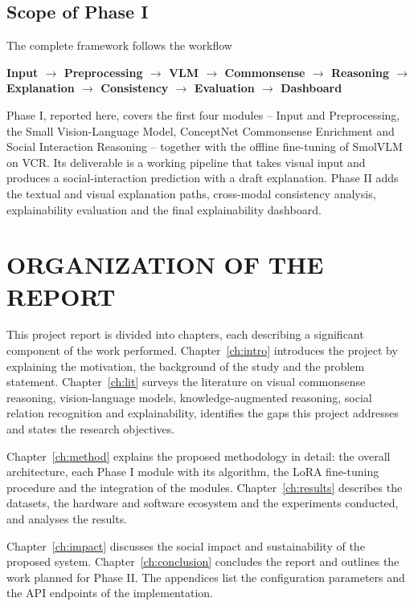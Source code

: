 \subsection{Scope of Phase I}
The complete framework follows the workflow
\begin{center}
\small\textbf{Input $\rightarrow$ Preprocessing $\rightarrow$ VLM $\rightarrow$ Commonsense $\rightarrow$ Reasoning $\rightarrow$ Explanation $\rightarrow$ Consistency $\rightarrow$ Evaluation $\rightarrow$ Dashboard}
\end{center}
Phase I, reported here, covers the first four modules -- Input and Preprocessing, the Small Vision-Language Model, ConceptNet Commonsense Enrichment and Social Interaction Reasoning -- together with the offline fine-tuning of SmolVLM on VCR. Its deliverable is a working pipeline that takes visual input and produces a social-interaction prediction with a draft explanation. Phase II adds the textual and visual explanation paths, cross-modal consistency analysis, explainability evaluation and the final explainability dashboard.

\section{ORGANIZATION OF THE REPORT}

This project report is divided into chapters, each describing a significant component of the work performed. Chapter~\ref{ch:intro} introduces the project by explaining the motivation, the background of the study and the problem statement. Chapter~\ref{ch:lit} surveys the literature on visual commonsense reasoning, vision-language models, knowledge-augmented reasoning, social relation recognition and explainability, identifies the gaps this project addresses and states the research objectives.

Chapter~\ref{ch:method} explains the proposed methodology in detail: the overall architecture, each Phase I module with its algorithm, the LoRA fine-tuning procedure and the integration of the modules. Chapter~\ref{ch:results} describes the datasets, the hardware and software ecosystem and the experiments conducted, and analyses the results.

Chapter~\ref{ch:impact} discusses the social impact and sustainability of the proposed system. Chapter~\ref{ch:conclusion} concludes the report and outlines the work planned for Phase II. The appendices list the configuration parameters and the API endpoints of the implementation.
